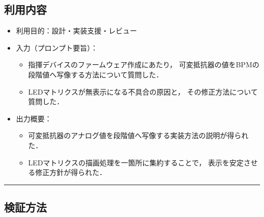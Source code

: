 \documentclass[uplatex,dvipdfmx,a4paper,11pt]{jsarticle}
\newcommand{\sectionrule}{\par\medskip\noindent\rule{\linewidth}{0.6pt}\par\medskip}
\begin{document}
\subsection{利用内容}

\begin{itemize}
  \item 利用目的：設計・実装支援・レビュー

  \item 入力（プロンプト要旨）：
    \begin{itemize}
      \item 指揮デバイスのファームウェア作成にあたり，
      可変抵抗器の値をBPMの段階値へ写像する方法について質問した．

      \item LEDマトリクスが無表示になる不具合の原因と，
      その修正方法について質問した．
    \end{itemize}

  \item 出力概要：
    \begin{itemize}
      \item 可変抵抗器のアナログ値を段階値へ写像する実装方法の説明が得られた．

      \item LEDマトリクスの描画処理を一箇所に集約することで，
      表示を安定させる修正方針が得られた．
    \end{itemize}
\end{itemize}


\sectionrule

\subsection{検証方法}
\end{document}
